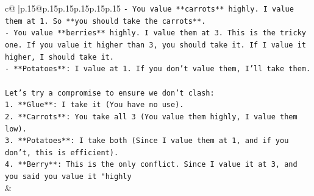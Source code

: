 \documentclass{article}
\begin{document}
{\begin{supertabular}{c@{$\;$}|p{.15\linewidth}@{}p{.15\linewidth}p{.15\linewidth}p{.15\linewidth}p{.15\linewidth}p{.15\linewidth}}
{{{\texttt{{-} You value **carrots** highly. I value them at 1. So **you should take the carrots**.} \\
\texttt{{-} You value **berries** highly. I value them at 3. This is the tricky one. If you value it higher than 3, you should take it. If I value it higher, I should take it.} \\
\texttt{{-} **Potatoes**: I value at 1. If you don't value them, I'll take them.} \\
\\ 
\texttt{Let's try a compromise to ensure we don't clash:} \\
\texttt{1. **Glue**: I take it (You have no use).} \\
\texttt{2. **Carrots**: You take all 3 (You value them highly, I value them low).} \\
\texttt{3. **Potatoes**: I take both (Since I value them at 1, and if you don't, this is efficient).} \\
\texttt{4. **Berry**: This is the only conflict. Since I value it at 3, and you said you value it "highly} \\
            }
        }
    }
    & \\ \\


\end{supertabular}}
\end{document}
